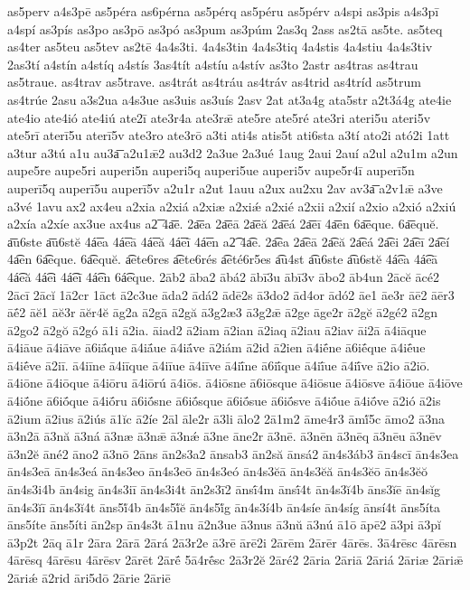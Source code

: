{as5perv
a4s3pē
as5péra
as6pérna
as5pérq
as5péru
as5pérv
a4spi
as3pis
a4s3pī
a4spí
as3pís
as3po
as3pō
as3pó
as3pum
as3púm
2as3q
2ass
as2tā
as5te.
as5teq
as4ter
as5teu
as5tev
as2tē
4a4s3ti.
4a4s3tin
4a4s3tiq
4a4stis
4a4stiu
4a4s3tiv
2as3tí
a4stín
a4stíq
a4stís
3as4tít
a4stíu
a4stív
as3to
2astr
as4tras
as4trau
as5traue.
as4trav
as5trave.
as4trát
as4tráu
as4tráv
as4trid
as4tríd
as5trum
as4trúe
2asu
a3s2ua
a4s3ue
as3uis
as3uís
2asv
2at
at3a4g
ata5str
a2t3á4g
ate4ie
ate4io
ate4ió
ate4iú
ate2ī
ate3r4a
ate3rǣ
ate5re
ate5ré
ate3ri
ateri5u
ateri5v
ate5rī
aterī5u
aterī5v
ate3ro
ate3rō
a3ti
ati4s
atis5t
ati6sta
a3tí
ato2i
ató2i
1att
a3tur
a3tú
a1u
au3a͞
a2u1ǣ2
au3d2
2a3ue
2a3ué
1aug
2aui
2auí
a2ul
a2u1m
a2un
aupe5re
aupe5ri
auperi5n
auperi5q
auperi5ue
auperi5v
aupe5r4ī
auperī5n
auperī5q
auperī5u
auperī5v
a2u1r
a2ut
1auu
a2ux
au2xu
2av
av3a͞
a2v1ǣ
a3ve
a3vé
1avu
ax2
ax4eu
a2xia
a2xiá
a2xiæ
a2xiǽ
a2xié
a2xii
a2xií
a2xio
a2xió
a2xiú
a2xía
a2xíe
ax3ue
ax4us
a2͞
4a͞e.
2a͞ea
2a͞eā
2a͞eă
2a͞eá
2a͞eī
4a͞en
6a͞eque.
6a͞equĕ.
a͞u6ste
a͞u6stĕ
4á͞ea
4á͞eā
4á͞eă
4á͞eī
4á͞en
a2͡
4a͡e.
2a͡ea
2a͡eā
2a͡eă
2a͡eá
2a͡ei
2a͡eī
2a͡eí
4a͡en
6a͡eque.
6a͡equĕ.
a͡ete6res
a͡ete6rés
a͡eté6r5es
a͡u4st
a͡u6ste
a͡u6stĕ
4á͡ea
4á͡eā
4á͡eă
4á͡ei
4á͡eī
4á͡en
6á͡eque.
2āb2
āba2
ābá2
ābī3u
ābī3v
ābo2
āb4un
2ācĕ
ācé2
2ācī
2ācĭ
1ā2cr
1āct
ā2c3ue
āda2
ādá2
ādē2s
ā3do2
ād4or
ādó2
āe1
āe3r
āē2
āēr3
āḗ2
āĕ1
āĕ3r
āĕr4ĕ
āg2a
ā2gā
ā2gă
ā3g2æ3
ā3g2ǣ
ā2ge
āge2r
ā2gĕ
ā2gé2
ā2gn
ā2go2
ā2gŏ
ā2gó
ā1i
ā2ia.
āiad2
ā2iam
ā2ian
ā2iaq
ā2iau
ā2iav
āi2ā
ā4iāque
ā4iāue
ā4iāve
ā6iā́que
ā4iā́ue
ā4iā́ve
ā2iám
ā2id
ā2ien
ā4iḗne
ā6iḗque
ā4iḗue
ā4iḗve
ā2iī.
ā4iīne
ā4iīque
ā4iīue
ā4iīve
ā4iī́ne
ā6iī́que
ā4iī́ue
ā4iī́ve
ā2io
ā2iō.
ā4iōne
ā4iōque
ā4iōru
ā4iōrú
ā4iōs.
ā4iōsne
ā6iōsque
ā4iōsue
ā4iōsve
ā4iōue
ā4iōve
ā4iṓne
ā6iṓque
ā4iṓru
ā6iṓsne
ā6iṓsque
ā6iṓsue
ā6iṓsve
ā4iṓue
ā4iṓve
ā2ió
ā2is
ā2ium
ā2ius
ā2iús
ā1ĭc
ā2íe
2āl
āle2r
ā3li
ālo2
2ā1m2
āme4r3
āmĭ́5c
āmo2
ā3na
ā3n2ā
ā3nă
ā3ná
ā3næ
ā3nǣ
ā3nǽ
ā3ne
āne2r
ā3nē.
ā3nēn
ā3nēq
ā3nēu
ā3nēv
ā3n2ĕ
āné2
āno2
ā3nō
2āns
ān2s3a2
ānsab3
ān2să
ānsá2
ān4s3áb3
ān4scī
ān4s3ea
ān4s3eā
ān4s3eá
ān4s3eo
ān4s3eō
ān4s3eó
ān4s3ĕā
ān4s3ĕă
ān4s3ĕō
ān4s3ĕŏ
ān4s3i4b
ān4sig
ān4s3iī
ān4s3i4t
ān2s3ī2
ānsī́4m
ānsī́4t
ān4s3ĭ4b
āns3ĭē
ān4sĭg
ān4s3ĭī
ān4s3ĭ4t
āns5ĭ́4b
ān4s5ĭ́ĕ
ān4s5ĭ́g
ān4s3í4b
ān4síe
ān4síg
ānsí4t
āns5íta
āns5íte
āns5íti
ān2sp
ān4s3t
ā1nu
ā2n3ue
ā3nus
ā3nŭ
ā3nú
ā1ō
āpē2
ā3pi
ā3pĭ
ā3p2t
2āq
ā1r
2āra
2ārā
2ārá
2ā3r2e
ā3rē
ārē2i
2ārēm
2ārēr
4ārēs.
3ā4rēsc
4ārēsn
4ārēsq
4ārēsu
4ārēsv
2ārēt
2ārḗ
5ā4rḗsc
2ā3r2ĕ
2āré2
2āria
2āriā
2āriá
2āriæ
2āriǣ
2āriǽ
ā2rid
āri5dō
2ārie
2āriē
}
